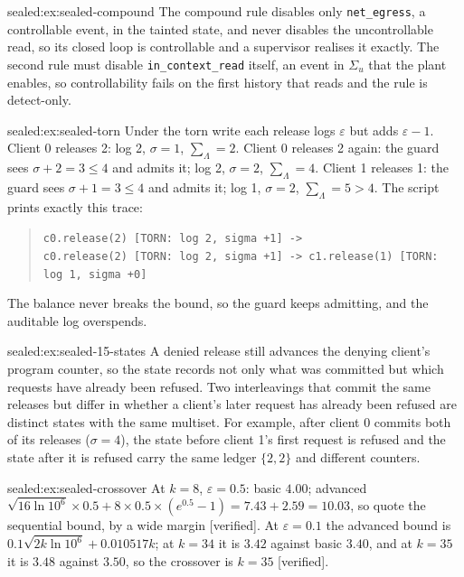 \begin{pdSolution}{sealed:ex:sealed-compound}
The compound rule disables only \texttt{net\_egress}, a controllable event, in
the tainted state, and never disables the uncontrollable read, so its closed
loop is controllable and a supervisor realises it exactly. The second rule
must disable \texttt{in\_context\_read} itself, an event in $\Sigma_u$ that the
plant enables, so controllability fails on the first history that reads and the
rule is detect-only.
\end{pdSolution}
\begin{pdSolution}{sealed:ex:sealed-torn}
Under the torn write each release logs $\varepsilon$ but adds $\varepsilon-1$.
Client 0 releases 2: log 2, $\sigma=1$, $\sum_\Lambda=2$. Client 0 releases 2
again: the guard sees $\sigma+2=3\le4$ and admits it; log 2, $\sigma=2$,
$\sum_\Lambda=4$. Client 1 releases 1: the guard sees $\sigma+1=3\le4$ and
admits it; log 1, $\sigma=2$, $\sum_\Lambda=5>4$. The script prints exactly
this trace:
\begin{quote}\footnotesize\texttt{c0.release(2) [TORN: log 2, sigma +1] ->}\\
\texttt{c0.release(2) [TORN: log 2, sigma +1] -> c1.release(1) [TORN: log 1, sigma +0]}
\end{quote}
The balance never breaks the bound, so the guard keeps admitting, and the
auditable log overspends.
\end{pdSolution}
\begin{pdSolution}{sealed:ex:sealed-15-states}
A denied release still advances the denying client's program counter, so the
state records not only what was committed but which requests have already been
refused. Two interleavings that commit the same releases but differ in whether
a client's later request has already been refused are distinct states with the
same multiset. For example, after client 0 commits both of its releases
($\sigma=4$), the state before client 1's first request is refused and the
state after it is refused carry the same ledger $\{2,2\}$ and different
counters.
\end{pdSolution}
\begin{pdSolution}{sealed:ex:sealed-crossover}
At $k=8$, $\varepsilon=0.5$: basic $4.00$; advanced
$\sqrt{16\ln 10^{6}}\times0.5+8\times0.5\times(e^{0.5}-1)=7.43+2.59=10.03$,
so quote the sequential bound, by a wide margin [verified]. At
$\varepsilon=0.1$ the advanced bound is
$0.1\sqrt{2k\ln 10^{6}}+0.010517k$; at $k=34$ it is $3.42$ against basic
$3.40$, and at $k=35$ it is $3.48$ against $3.50$, so the crossover is $k=35$
[verified].
\end{pdSolution}

